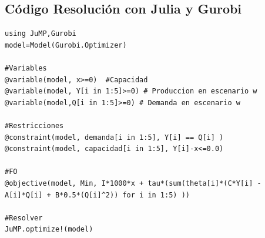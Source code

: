 \subsection{Código Resolución con Julia y Gurobi}\label{ejerciciojulia}
\begin{footnotesize}
\begin{lstlisting}
using JuMP,Gurobi
model=Model(Gurobi.Optimizer)

#Variables
@variable(model, x>=0)  #Capacidad
@variable(model, Y[i in 1:5]>=0) # Produccion en escenario w
@variable(model,Q[i in 1:5]>=0) # Demanda en escenario w

#Restricciones
@constraint(model, demanda[i in 1:5], Y[i] == Q[i] )
@constraint(model, capacidad[i in 1:5], Y[i]-x<=0.0)

#FO
@objective(model, Min, I*1000*x + tau*(sum(theta[i]*(C*Y[i] - A[i]*Q[i] + B*0.5*(Q[i]^2)) for i in 1:5) ))

#Resolver
JuMP.optimize!(model)
\end{lstlisting}
\end{footnotesize}



